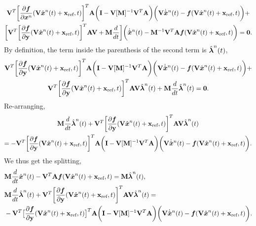 \documentclass[3p,computermodern,10pt]{elsarticle}
\begin{document}
\begin{appendices}
\begin{multline*}
\basisspace^T \bigg[\frac{\partial \velocity}{\partial \state^n}(\veloargsromn) \bigg]^T \stweightingMatArg{n}\bigg( \mathbf{I} - \basisspace[\massArgnt{n}]^{-1} \basisspace^T \stweightingMatArg{n} \bigg)  \bigg(  \basisspace \genstateDotArg{n}{t}   -  \velocity(\veloargsromn) \bigg)  + \\  
\bigg[ \basisspace^T \bigg[\frac{\partial \velocity}{\partial \stateyDiscrete}(\veloargsromn) \bigg]^T \stweightingMatArg{n} \basisspace  +   \mass \frac{d}{dt} \bigg] \bigg( \genstateDotArg{n}{t}  - \mass^{-1} \basisspace^T \stweightingMatArg{n}  \velocity(\veloargsromn) \bigg) = \bz.
\end{multline*}
By definition, the term inside the parenthesis of the second term is $\adjointArg{n}{t}$,
\begin{multline*}
\basisspace^T \bigg[\frac{\partial \velocity}{\partial \stateyDiscrete}(\veloargsromn) \bigg]^T \stweightingMatArg{n}\bigg( \mathbf{I} - \basisspace [\massArgnt{n}]^{-1} \basisspace^T \stweightingMatArg{n} \bigg)  \bigg(  \basisspace \genstateDotArg{n}{t}    -  \velocity(\veloargsromn) \bigg)  +   \\ \basisspace^T \bigg[\frac{\partial \velocity}{\partial \stateyDiscrete}(\veloargsromn) \bigg]^T \stweightingMatArg{n} \basisspace \adjointArg{n}{t}  +  \massArgnt{n} \frac{d}{dt} \adjointArg{n}{t}= \bz.
\end{multline*}
Re-arranging,
\begin{multline*}
\mass \frac{d }{dt}\adjointArg{n}{t} + \basisspace^T \bigg[\frac{\partial \velocity}{\partial \stateyDiscrete} ( \veloargsromn ) \bigg]^T \stweightingMatArg{n} \basisspace  \adjointArg{n}{t}  \\
= - \basisspace^T \bigg[\frac{\partial \velocity}{\partial \stateyDiscrete}(\veloargsromn)\bigg]^T \stweightingMatArg{n}\bigg( \mathbf{I} - \basisspace [\massArgnt{n}]^{-1} \basisspace^T \stweightingMatArg{n} \bigg)  \bigg(  \basisspace \genstateDotArg{n}{t}   -  \velocity(\veloargsromn) \bigg).
\end{multline*}
We thus get the splitting,
\begin{align*}\label{eq:lspg_continuous_appendix}
& \mass \frac{d}{dt}\genstateArg{n}{t}  -  \basisspace^T \stweightingMatArg{n} \velocity(\veloargsromn) =  \mass \adjointArg{n}{t},\\
&\mass \frac{d}{dt} \adjointArg{n}{t}  + \basisspace^T \bigg[\frac{\partial \velocity}{\partial \stateyDiscrete} (\veloargsromn) \bigg]^T \stweightingMatArg{n} \basisspace \adjointArg{n}{t} = \\
& -\basisspace^T \big[ \frac{\partial \velocity}{\partial \stateyDiscrete}(\veloargsromn) \big] ^T \stweightingMatArg{n}  \bigg( \mathbf{I} -   \basisspace [\massArgnt{n}]^{-1} \basisspace^T   \stweightingMatArg{n} \bigg)\bigg( \basisspace \genstateDotArg{n}{t}   -   \velocity(\veloargsromn) \bigg) . 
\end{align*}

\end{appendices}
\end{document}

